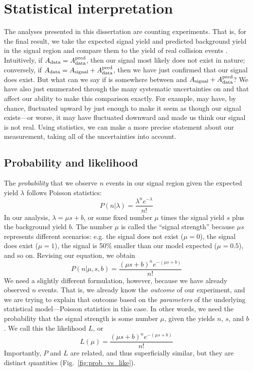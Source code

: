 \section{Statistical interpretation}
The analyses presented in this dissertation are counting experiments. 
That is, for the final result, we take the expected signal yield \Asignal and predicted background yield \AdataPred in the signal region and compare them to the yield of real collision events \Adata. 
Intuitively, if $A_{\text{data}} = A_{\text{data}}^{\text{pred}}$, then our signal most likely does not exist in nature; conversely, if $A_{\text{data}} = A_{\text{signal}}+A_{\text{data}}^{\text{pred}}$, then we have just confirmed that our signal does exist. 
But what can we say if \Adata is somewhere between \AdataPred and $A_{\text{signal}}+A_{\text{data}}^{\text{pred}}$? 
We have also just enumerated through the many systematic uncertainties on \Asignal and \AdataPred that affect our ability to make this comparison exactly. 
For example, \AdataPred may have, by chance, fluctuated upward by just enough to make it seem as though our signal exists---or worse, it may have fluctuated downward and made us think our signal is not real. 
Using statistics, we can make a more precise statement about our measurement, taking all of the uncertainties into account. 

\subsection{Probability and likelihood}
The \textit{probability} that we observe $n$ events in our signal region given the expected yield $\lambda$ follows Poisson statistics:
\begin{equation}
    P(n|\lambda) = \frac{\lambda^n e^{-\lambda}}{n!}
\end{equation}
In our analysis, $\lambda = \mu s + b$, or some fixed number $\mu$ times the signal yield $s$ plus the background yield $b$. 
The number $\mu$ is called the ``signal strength'' because $\mu s$ represents different scenarios: e.g. the signal does not exist ($\mu = 0$), the signal does exist ($\mu = 1$), the signal is 50\% smaller than our model expected ($\mu = 0.5$), and so on. 
Revising our equation, we obtain
\begin{equation}
    P(n|\mu, s, b) = \frac{(\mu s + b)^n e^{-(\mu s + b)}}{n!}
\end{equation}
We need a slightly different formulation, however, because we have already observed $n$ events. 
That is, we already know the \textit{outcome} of our experiment, and we are trying to explain that outcome based on the \textit{parameters} of the underlying statistical model---Poisson statistics in this case. 
In other words, we need the probability that the signal strength is some number $\mu$, given the yields $n$, $s$, and $b$. 
We call this the likelihood $L$, or
\begin{equation}
    L(\mu) = \frac{(\mu s + b)^n e^{-(\mu s + b)}}{n!}
\end{equation}
Importantly, $P$ and $L$ are related, and thus superficially similar, but they are distinct quantities (Fig.~\ref{fig:prob_vs_like}). 

